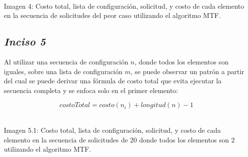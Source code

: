 \begin{center}
\\
\vspace{0.02in}
\small\textcolor{FSBlue}{Imagen 4: Costo total, lista de configuración, solicitud, y costo de cada elemento en la secuencia de solicitudes del peor caso utilizando el algoritmo MTF.}
\end{center}

\subsection*{\textit{\textbf{Inciso 5}}}

Al utilizar una secuencia de configuración \(n\), donde todos los elementos son iguales, sobre una lista de configuración \(m\), se puede observar un patrón a partir del cual se puede derivar una fórmula de costo total que evita ejecutar la secuencia completa y se enfoca solo en el primer elemento:

\[costoTotal = costo(n_{i}) + longitud(n) - 1\]

\begin{center}
\\
\vspace{0.02in}
\small\textcolor{FSBlue}{Imagen 5.1: Costo total, lista de configuración, solicitud, y costo de cada elemento en la secuencia de solicitudes de 20 donde todos los elementos son 2 utilizando el algoritmo MTF.}
\end{center}

